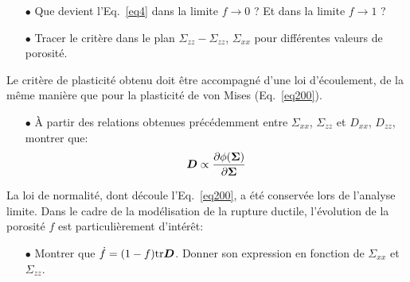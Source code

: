 \documentclass[french,english,12pt]{exam}
\begin{document}
\begin{itemize}
\item[$\bullet$] Que devient l'Eq.~\ref{eq4} dans la limite $f \rightarrow 0$ ? Et dans la limite $f \rightarrow 1$ ?\\

\item[$\bullet$] Tracer le critère dans le plan $\Sigma_{zz} - \Sigma_{zz}$, $\Sigma_{xx}$ pour différentes valeurs de porosité.\\
\end{itemize}

\noindent
Le critère de plasticité obtenu doit être accompagné d'une loi d'écoulement, de la même manière que pour la plasticité de von Mises (Eq.~\ref{eq200}).\\

\begin{itemize}
\item[$\bullet$] \`A partir des relations obtenues précédemment entre $\Sigma_{xx}$, $\Sigma_{zz}$ et $D_{xx}$, $D_{zz}$, montrer que:
  \begin{equation}
     \boldsymbol{D} \propto \frac{\partial \phi(\boldsymbol{\Sigma})}{\partial \boldsymbol{\Sigma}}
  \end{equation}
\end{itemize}

\noindent
La loi de normalité, dont découle l'Eq.~\ref{eq200}, a été conservée lors de l'analyse limite. Dans le cadre de la modélisation de la rupture ductile, l'évolution de la porosité $f$ est particulièrement d'intérêt:\\

\begin{itemize}
  \item[$\bullet$] Montrer que $\dot{f} = (1 - f) \mathrm{tr} \boldsymbol{D}$. Donner son expression en fonction de $\Sigma_{xx}$ et $\Sigma_{zz}$.\\
\end{itemize}
\end{document}
